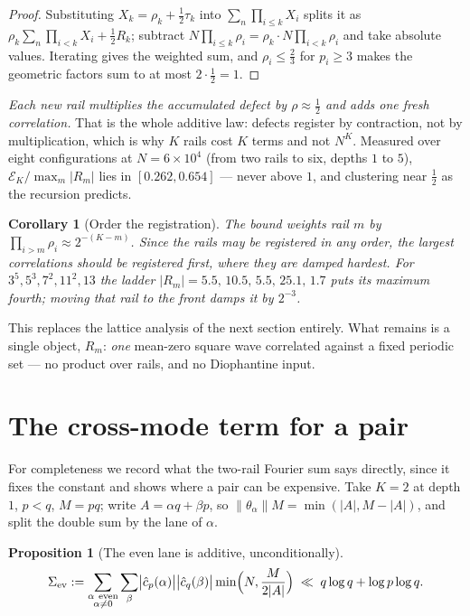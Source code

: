 \documentclass[11pt]{article}
\newtheorem{proposition}[theorem]{Proposition}
\newtheorem{corollary}[theorem]{Corollary}
\begin{document}
\begin{proof}
Substituting $X_k=\rho_k+\frac12\tau_k$ into $\sum_n\prod_{i\le k}X_i$ splits it as
$\rho_k\sum_n\prod_{i<k}X_i+\frac12R_k$; subtract $N\prod_{i\le k}\rho_i
=\rho_k\cdot N\prod_{i<k}\rho_i$ and take absolute values.  Iterating gives the
weighted sum, and $\rho_i\le\frac23$ for $p_i\ge3$ makes the geometric factors sum to
at most $2\cdot\frac12=1$.
\end{proof}

\emph{Each new rail multiplies the accumulated defect by $\rho\approx\frac12$ and adds
one fresh correlation.}  That is the whole additive law: defects register by
contraction, not by multiplication, which is why $K$ rails cost $K$ terms and not
$N^{K}$.  Measured over eight configurations at $N=6\times10^4$ (from two rails to six,
depths $1$ to $5$), $\mathcal E_K/\max_m|R_m|$ lies in $[0.262,0.654]$ --- never above
$1$, and clustering near $\frac12$ as the recursion predicts.

\begin{corollary}[Order the registration]\label{cor:order}
The bound weights rail $m$ by $\prod_{i>m}\rho_i\approx2^{-(K-m)}$.  Since the rails may
be registered in any order, the largest correlations should be registered
\emph{first}, where they are damped hardest.  For $3^5,5^3,7^2,11^2,13$ the ladder
$|R_m|=5.5,\,10.5,\,5.5,\,25.1,\,1.7$ puts its maximum fourth; moving that rail to the
front damps it by $2^{-3}$.
\end{corollary}

This replaces the lattice analysis of the next section entirely.  What remains is a
single object, $R_m$: \emph{one} mean-zero square wave correlated against a fixed
periodic set --- no product over rails, and no Diophantine input.

\section{The cross-mode term for a pair}

For completeness we record what the two-rail Fourier sum says directly, since it fixes
the constant and shows where a pair can be expensive.  Take $K=2$ at depth $1$, $p<q$,
$M=pq$; write $A=\alpha q+\beta p$, so $\|\theta_\alpha\|M=\min(|A|,M-|A|)$, and split
the double sum by the lane of $\alpha$.

\begin{proposition}[The even lane is additive, unconditionally]\label{prop:even}
\[
\Sigma_{\rm ev}:=\sum_{\substack{\alpha\ \text{even}\\ \alpha\ne0}}\sum_{\beta}
\bigl|\hat c_p(\alpha)\bigr|\bigl|\hat c_q(\beta)\bigr|\min\Bigl(N,\frac{M}{2|A|}\Bigr)
\;\ll\;q\log q+\log p\log q .
\]
\end{proposition}
\end{document}
